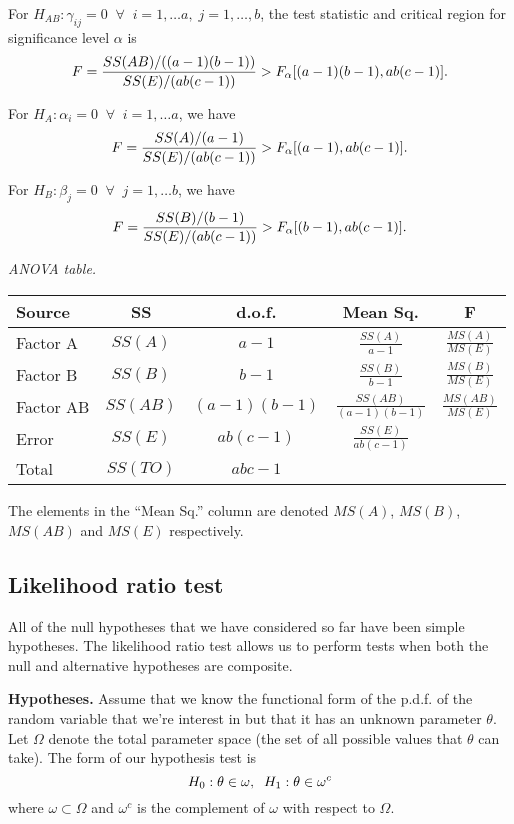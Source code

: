 \documentclass[10pt, two column]{article}
\begin{document}
For $H_{AB} : \gamma_{ij} = 0 \;\; \forall \;\; i = 1, \dots a, \; j = 1, \dots, b$, the test statistic and critical region for significance level $\alpha$ is \vspace{-5pt}
\[
F = \frac{SS(AB)/((a-1)(b-1))}{SS(E)/(ab(c-1))} > F_{\alpha}[(a-1)(b-1), ab(c-1)]. \vspace{-5pt}
\]

For $H_{A} : \alpha_{i} = 0 \;\; \forall \;\; i = 1, \dots a$, we have \vspace{-5pt}
\[
F = \frac{SS(A)/(a-1)}{SS(E)/(ab(c-1))} > F_{\alpha}[(a-1), ab(c-1)]. \vspace{-5pt}
\]

For $H_{B} : \beta_{j} = 0 \;\; \forall \;\; j = 1, \dots b$, we have \vspace{-5pt}
\[
F = \frac{SS(B)/(b-1)}{SS(E)/(ab(c-1))} > F_{\alpha}[(b-1), ab(c-1)]. \vspace{-5pt}
\]

\emph{ANOVA table.}

{\small
\begin{tabular}{l | c c c c}
Source & SS & d.o.f. & Mean Sq. & F \\
\hline
Factor A & $SS(A)$ & $a-1$ & $\frac{SS(A)}{a-1}$ & $\frac{MS(A)}{MS(E)}$ \\
Factor B & $SS(B)$ & $b-1$ & $\frac{SS(B)}{b-1}$ & $\frac{MS(B)}{MS(E)}$ \\
Factor AB & $SS(AB)$ &$(a-1)(b-1)$ &$\frac{SS(AB)}{(a-1)(b-1)}$ &$\frac{MS(AB)}{MS(E)}$ \\
Error & $SS(E)$ & $ab(c-1)$ & $\frac{SS(E)}{ab(c-1)}$ \\
Total & $SS(TO)$ & $abc-1$\\  
\hline
\end{tabular}}

The elements in the ``Mean Sq.'' column are denoted $MS(A)$, $MS(B)$, $MS(AB)$ and $MS(E)$ respectively. 

\subsection{Likelihood ratio test} \label{LR test}

All of the null hypotheses that we have considered so far have been simple hypotheses. The likelihood ratio test allows us to perform tests when both the null and alternative hypotheses are composite. 

{\bf Hypotheses.} Assume that we know the functional form of the p.d.f. of the random variable that we're interest in but that it has an unknown parameter $\theta$. Let $\Omega$ denote the total parameter space (the set of all possible values that $\theta$ can take). The form of our hypothesis test is \vspace{-5pt}
\[
H_{0} : \theta \in \omega, \;\; H_{1} : \theta \in \omega^{c} \vspace{-5pt}
\]
where $\omega \subset \Omega$ and $\omega^{c}$ is the complement of $\omega$ with respect to $\Omega$. 
\end{document}
